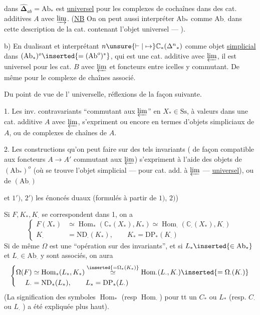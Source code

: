 dans $\widehat{\boldsymbol\Delta}_{ab}=\mathrm{Ab}_*$ est \uline{universel} pour les
complexes de cochaînes dans des cat.
additives $A$ avec $\varinjlim$. \unsure{\&} (\uline{NB} On 
on peut aussi interpréter $\mathrm{Ab}_*$ comme $\mathrm{Ab}_\cdot$
dans cette description de la cat. contenant
l'objet universel --- ).

b) En dualisant et interprétant
$n\unsure{\vdash|\mapsto}\mathbb C_*({\Delta^n}_*)$ comme objet \uline{simplicial}
dans $(\mathrm{Ab}_*)^o\inserted{=(\mathrm{Ab}^o)^*}$, qui est une cat. additive
avec $\varprojlim$, il est universel pour les
cat. $B$ avec $\varprojlim$ et foncteurs entre
icelles y commutant. De même pour le
complexe de chaînes associé.

Du point de vue de l' universelle,
réflexions de la façon suivante.

1. Les inv. contravariants ``commutant aux
$\varprojlim$'' en $X_*\in\mathrm{Ss}$, à valeurs dans une
cat. additive $A$ avec $\varprojlim$, s'expriment
ou encore en termes d'objets simpliciaux
de $A$, ou de complexes de chaînes de $A$.

2. Les constructions qu'on peut faire sur des
tels invariants ( de façon compatible aux
foncteurs $A\longrightarrow A'$ commutant aux $\varprojlim$)
s'expriment à l'aide des objets
de $(\mathrm{Ab}_*)^o$ (où se trouve l'objet
simplicial --- pour cat. add. à $\varprojlim$ ---
\uline{universel}), ou de $(\mathrm{Ab}_\cdot)$

et $1')$, $2')$ les énoncés duaux (formulés
à partir de $1)$, $2)$)

Si $F,K_*,K_\cdot$ se correspondent dans
1, on a
\[
\left\{\begin{aligned}
F(X_*)&\simeq\operatorname{Hom}_*(\mathbb C_*(X_*),K_*)\simeq
\operatorname{Hom}_\cdot(\mathbb C_\cdot(X_*),K_\cdot)\\
K_\cdot&=\mathrm{ND}_\cdot(K_*),\qquad K_*=\mathrm{DP}_*(K_\cdot)
\end{aligned}\right.
\]
Si de même $\Omega$ est une ``opération sur des
invariants'', et si $L_*\inserted{\in\mathrm{Ab}_*}$ et $L_\cdot\in\mathrm{Ab}_\cdot$ y
sont associés, on aura
\[
\left\{\begin{aligned}
\Omega(F)&\simeq\operatorname{Hom}_*(L_*,K_*)\overset{\inserted{=\Omega_*(K_*)}}\simeq
\operatorname{Hom}_\cdot(L_\cdot,K_\cdot)\inserted{=\Omega_\cdot(K_\cdot)}\\
L_\cdot&=\mathrm{ND}_*(L_*),\qquad L_*=\mathrm{DP}_*(L_\cdot)
\end{aligned}\right.
\]
(La signification des symboles $\operatorname{Hom}_*$ (resp $\operatorname{Hom}_\cdot$)
pour tt un $C_*$ ou $L_*$  (resp. $C_\cdot$ ou $L_\cdot$ )
a été expliquée plus haut).


